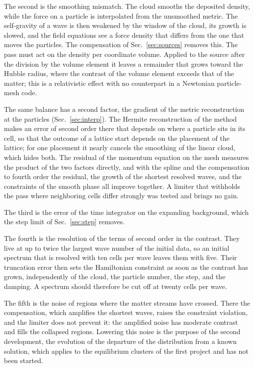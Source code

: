 \documentclass[aps,prd,twocolumn,10pt,superscriptaddress,nofootinbib,longbibliography,floatfix]{revtex4-2}
\begin{document}
The second is the smoothing mismatch. The cloud smooths the deposited density, while the force on a particle is interpolated from the unsmoothed metric. The self-gravity of a wave is then weakened by the window of the cloud, its growth is slowed, and the field equations see a force density that differs from the one that moves the particles. The compensation of Sec.~\ref{sec:sources} removes this. The pass must act on the density per coordinate volume. Applied to the source after the division by the volume element it leaves a remainder that grows toward the Hubble radius, where the contrast of the volume element exceeds that of the matter; this is a relativistic effect with no counterpart in a Newtonian particle-mesh code.

The same balance has a second factor, the gradient of the metric reconstruction at the particles (Sec.~\ref{sec:interp}). The Hermite reconstruction of the method makes an error of second order there that depends on where a particle sits in its cell, so that the outcome of a lattice start depends on the placement of the lattice; for one placement it nearly cancels the smoothing of the linear cloud, which hides both. The residual of the momentum equation on the mesh measures the product of the two factors directly, and with the spline and the compensation to fourth order the residual, the growth of the shortest resolved waves, and the constraints of the smooth phase all improve together. A limiter that withholds the pass where neighboring cells differ strongly was tested and brings no gain.

The third is the error of the time integrator on the expanding background, which the step limit of Sec.~\ref{sec:step} removes.

The fourth is the resolution of the terms of second order in the contrast. They live at up to twice the largest wave number of the initial data, so an initial spectrum that is resolved with ten cells per wave leaves them with five. Their truncation error then sets the Hamiltonian constraint as soon as the contrast has grown, independently of the cloud, the particle number, the step, and the damping. A spectrum should therefore be cut off at twenty cells per wave.

The fifth is the noise of regions where the matter streams have crossed. There the compensation, which amplifies the shortest waves, raises the constraint violation, and the limiter does not prevent it: the amplified noise has moderate contrast and fills the collapsed regions. Lowering this noise is the purpose of the second development, the evolution of the departure of the distribution from a known solution, which applies to the equilibrium clusters of the first project and has not been started.
\end{document}
